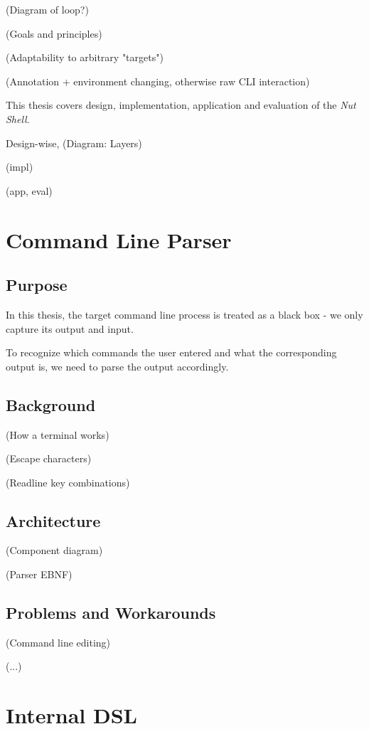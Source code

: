 \documentclass[twoside]{scrreprt}
\begin{document}
(Diagram of loop?)

(Goals and principles)

(Adaptability to arbitrary "targets")

(Annotation + environment changing, otherwise raw CLI interaction)

This thesis covers design, implementation, application and evaluation of the \emph{Nut Shell}.

Design-wise, (Diagram: Layers)

(impl)

(app, eval)

\chapter{Command Line Parser}

\section{Purpose}

In this thesis, the target command line process is treated as a black box - we only capture its output and input.

To recognize which commands the user entered and what the corresponding output is, we need to parse the output accordingly.

\section{Background}

        (How a terminal works)

        (Escape characters)

        (Readline key combinations)

\section{Architecture}

        (Component diagram)

        (Parser EBNF)

\section{Problems and Workarounds}

        (Command line editing)

        (...)

\chapter{Internal DSL}
\end{document}
